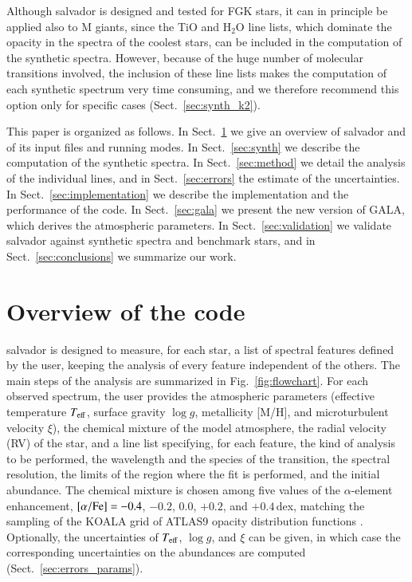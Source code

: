 \documentclass{aa}
\newcommand{\salvador}{salvador}   %
\begin{document}
Although \salvador{} is designed and tested for FGK stars, it can in
principle be applied also to M giants, since the TiO and H$_2$O line
lists, which dominate the opacity in the spectra of the coolest
stars, can be included in the computation of the synthetic spectra.
However, because of the huge number of molecular transitions involved,
the inclusion of these line lists makes the computation of each
synthetic spectrum very time consuming, and we therefore recommend
this option only for specific cases (Sect.~\ref{sec:synth_k2}).

This paper is organized as follows. In Sect.~\ref{sec:overview} we
give an overview of \salvador{} and of its input files and running
modes. In Sect.~\ref{sec:synth} we describe the computation of the
synthetic spectra. In Sect.~\ref{sec:method} we detail the analysis of
the individual lines, and in Sect.~\ref{sec:errors} the estimate of
the uncertainties. In Sect.~\ref{sec:implementation} we describe the
implementation and the performance of the code. In
Sect.~\ref{sec:gala} we present the new version of GALA, which
derives the atmospheric parameters. In Sect.~\ref{sec:validation} we
validate \salvador{} against synthetic spectra and benchmark stars,
and in Sect.~\ref{sec:conclusions} we summarize our work.

\section{Overview of the code}
\label{sec:overview}

\salvador{} is designed to measure, for each star, a list of spectral
features defined by the user, keeping the analysis of every feature
independent of the others. The main steps of the analysis are
summarized in Fig.~\ref{fig:flowchart}. For each observed spectrum,
the user provides the atmospheric parameters (effective temperature
$T_{\rm eff}$, surface gravity $\log g$, metallicity [M/H], and
microturbulent velocity $\xi$), the chemical mixture of the model
atmosphere, the radial velocity (RV) of the star, and a line list
specifying, for each feature, the kind of analysis to be performed,
the wavelength and the species of the transition, the spectral
resolution, the limits of the region where the fit is performed, and
the initial abundance. The chemical mixture is chosen among five
values of the $\alpha$-element enhancement, $[\alpha/{\rm
Fe}]=-0.4$, $-0.2$, $0.0$, $+0.2$, and $+0.4$\,dex, matching the
sampling of the KOALA grid of ATLAS9 opacity distribution functions
\citep[ODFs;][]{Mucciarelli2026}. Optionally, the uncertainties of
$T_{\rm eff}$, $\log g$, and $\xi$ can be given, in which case the
corresponding uncertainties on the abundances are computed
(Sect.~\ref{sec:errors_params}).
\end{document}
